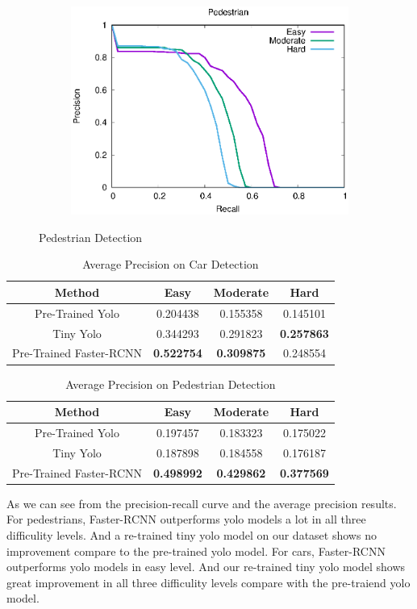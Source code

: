 \begin{figure}[H]
\begin{subfigure}{.34\textwidth}
    \includegraphics[width=1.0\linewidth]{img/FRCNN_Nov_8/plot_valid/pedestrian_detection.eps}
\end{subfigure}
\caption{Pedestrian Detection}
\end{figure}

\begin{table}[h!]
\centering
\begin{tabular}{ c | c | c | c }
\hline
Method & Easy & Moderate & Hard \\
\hline \hline
Pre-Trained Yolo & 0.204438 & 0.155358 & 0.145101 \\
Tiny Yolo & 0.344293 & 0.291823 & \bfseries 0.257863 \\
Pre-Trained Faster-RCNN & \bfseries 0.522754 & \bfseries 0.309875 & 0.248554 \\
\hline
\end{tabular}
\caption{Average Precision on Car Detection}
\end{table}

\begin{table}[h!]
\centering
\begin{tabular}{ c | c | c | c }
\hline
Method & Easy & Moderate & Hard \\
\hline \hline
Pre-Trained Yolo & 0.197457 & 0.183323 & 0.175022 \\
Tiny Yolo & 0.187898 & 0.184558 & 0.176187 \\
Pre-Trained Faster-RCNN & \bfseries 0.498992 & \bfseries 0.429862 & \bfseries 0.377569 \\
\hline
\end{tabular}
\caption{Average Precision on Pedestrian Detection}
\end{table}

As we can see from the precision-recall curve and the average precision results. For pedestrians, Faster-RCNN outperforms yolo models a lot in all three difficulity levels. And a re-trained tiny yolo model on our dataset shows no improvement compare to the pre-trained yolo model. For cars, Faster-RCNN outperforms yolo models in easy level. And our re-trained tiny yolo model shows great improvement in all three difficulity levels compare with the pre-traiend yolo model.